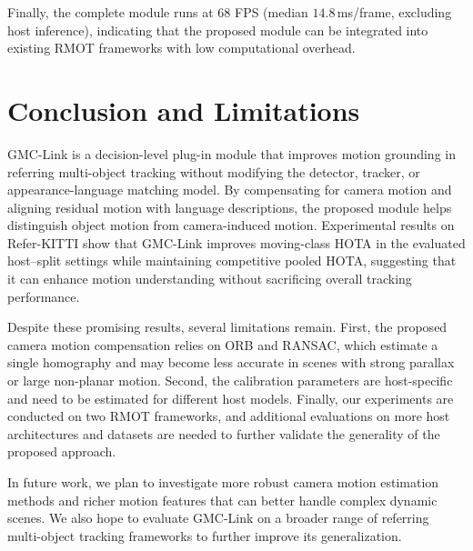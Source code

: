 \documentclass[sigconf,anonymous,nonacm]{acmart}
\begin{document}
Finally, the complete module runs at $68$ FPS (median $14.8$\,ms/frame, excluding host inference), indicating that the proposed module can be integrated into existing RMOT frameworks with low computational overhead.

\section{Conclusion and Limitations}
\label{sec:conclusion}
GMC-Link is a decision-level plug-in module that improves motion grounding in referring multi-object tracking without modifying the detector, tracker, or appearance-language matching model. By compensating for camera motion and aligning residual motion with language descriptions, the proposed module helps distinguish object motion from camera-induced motion. Experimental results on Refer-KITTI show that GMC-Link improves moving-class HOTA in the evaluated host--split settings while maintaining competitive pooled HOTA, suggesting that it can enhance motion understanding without sacrificing overall tracking performance.

Despite these promising results, several limitations remain. First, the proposed camera motion compensation relies on ORB and RANSAC, which estimate a single homography and may become less accurate in scenes with strong parallax or large non-planar motion. Second, the calibration parameters are host-specific and need to be estimated for different host models. Finally, our experiments are conducted on two RMOT frameworks, and additional evaluations on more host architectures and datasets are needed to further validate the generality of the proposed approach.

In future work, we plan to investigate more robust camera motion estimation methods and richer motion features that can better handle complex dynamic scenes. We also hope to evaluate GMC-Link on a broader range of referring multi-object tracking frameworks to further improve its generalization.



\end{document}
